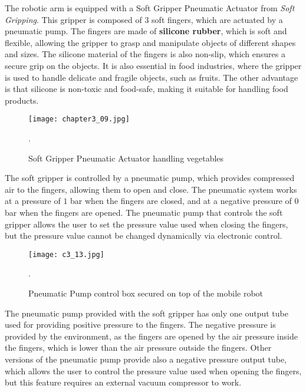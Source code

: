 The robotic arm is equipped with a Soft Gripper Pneumatic Actuator from \textit{Soft Gripping}.
This gripper is composed of 3 soft fingers, which are actuated by a pneumatic pump. The fingers are made of
\textbf{silicone rubber}, which is soft and flexible, allowing the gripper to grasp and manipulate objects of different shapes
and sizes. The silicone material of the fingers is also non-slip, which ensures a secure grip on the objects.
It is also essential in food industries, where the gripper is used to handle delicate and fragile objects, 
such as fruits. The other advantage is that silicone is non-toxic and food-safe, making it suitable for handling
food products.

\begin{figure}[t]
    \centering
    \texttt{[image: chapter3\_09.jpg]}
    \captionsetup{width=1\linewidth}
    \caption{Soft Gripper Pneumatic Actuator handling vegetables}.
    \label{fig:c3_img09}
\end{figure}

The soft gripper is controlled by a pneumatic pump, which provides compressed air to the fingers, allowing them
to open and close. The pneumatic system works at a pressure of $1$ bar when the fingers are closed, and at
a negative pressure of $0$ bar when the fingers are opened. The pneumatic pump that controls the soft gripper
allows the user to set the pressure value used when closing the fingers, but the pressure value cannot be
changed dynamically via electronic control. 

\begin{figure}[t]
    \centering
    \texttt{[image: c3\_13.jpg]}
    \captionsetup{width=1\linewidth}
    \caption{Pneumatic Pump control box secured on top of the mobile robot}.
    \label{fig:c3_img13}
\end{figure}

The pneumatic pump provided with the soft gripper has only one output tube used for providing positive pressure
to the fingers. The negative pressure is provided by the environment, as the fingers are opened by the air pressure
inside the fingers, which is lower than the air pressure outside the fingers. 
Other versions of the pneumatic pump provide also a negative pressure output tube, which allows the user to control
the pressure value used when opening the fingers, but this feature requires an external vacuum compressor to work.

